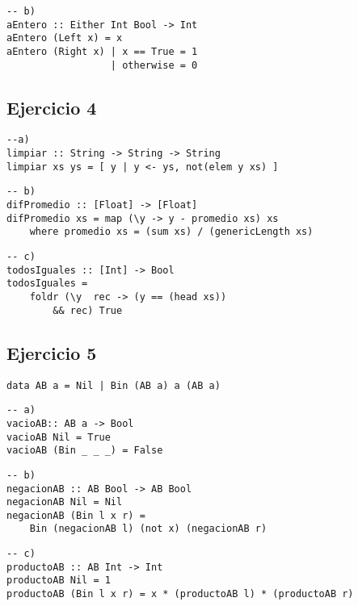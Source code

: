 \documentclass[10pt,a4paper]{article}
\begin{document}
\begin{centrado}
\begin{verbatim}
-- b)
aEntero :: Either Int Bool -> Int
aEntero (Left x) = x
aEntero (Right x) | x == True = 1
                  | otherwise = 0
\end{verbatim}
\end{centrado}

\subsection{Ejercicio 4}
\begin{centrado}
\begin{verbatim}
--a)
limpiar :: String -> String -> String
limpiar xs ys = [ y | y <- ys, not(elem y xs) ]
\end{verbatim}
\end{centrado}
\begin{centrado}
	\begin{verbatim}
-- b)
difPromedio :: [Float] -> [Float]
difPromedio xs = map (\y -> y - promedio xs) xs 
    where promedio xs = (sum xs) / (genericLength xs)
\end{verbatim}
\end{centrado}
\begin{centrado}
	\begin{verbatim}
-- c)
todosIguales :: [Int] -> Bool
todosIguales = 
	foldr (\y  rec -> (y == (head xs)) 
		&& rec) True
\end{verbatim}
\end{centrado}

\subsection{Ejercicio 5}
\begin{centrado}
\begin{verbatim}
data AB a = Nil | Bin (AB a) a (AB a)
\end{verbatim}
\end{centrado}
\begin{centrado}
	\begin{verbatim}
-- a)
vacioAB:: AB a -> Bool
vacioAB Nil = True
vacioAB (Bin _ _ _) = False
\end{verbatim}
\end{centrado}
\begin{centrado}
	\begin{verbatim}
-- b)
negacionAB :: AB Bool -> AB Bool
negacionAB Nil = Nil
negacionAB (Bin l x r) = 
	Bin (negacionAB l) (not x) (negacionAB r)
\end{verbatim}
\end{centrado}
\begin{centrado}
	\begin{verbatim}
-- c)
productoAB :: AB Int -> Int
productoAB Nil = 1
productoAB (Bin l x r) = x * (productoAB l) * (productoAB r)
\end{verbatim}
\end{centrado}
\end{document}
